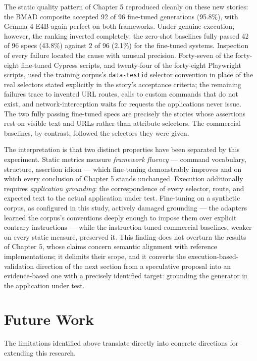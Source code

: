 The static quality pattern of Chapter 5 reproduced cleanly on these new
stories: the BMAD composite accepted 92 of 96 fine-tuned generations
(95.8\%), with Gemma 4 E4B again perfect on both frameworks. Under
genuine execution, however, the ranking inverted completely: the
zero-shot baselines fully passed 42 of 96 specs (43.8\%) against 2 of 96
(2.1\%) for the fine-tuned systems. Inspection of every failure located
the cause with unusual precision. Forty-seven of the forty-eight
fine-tuned Cypress scripts, and twenty-four of the forty-eight
Playwright scripts, used the training corpus's \texttt{data-testid}
selector convention in place of the real selectors stated explicitly in
the story's acceptance criteria; the remaining failures trace to
invented URL routes, calls to custom commands that do not exist, and
network-interception waits for requests the applications never issue.
The two fully passing fine-tuned specs are precisely the stories whose
assertions rest on visible text and URLs rather than attribute
selectors. The commercial baselines, by contrast, followed the selectors
they were given.

The interpretation is that two distinct properties have been separated
by this experiment. Static metrics measure \emph{framework fluency} ---
command vocabulary, structure, assertion idiom --- which fine-tuning
demonstrably improves and on which every conclusion of Chapter 5 stands
unchanged. Execution additionally requires \emph{application grounding}:
the correspondence of every selector, route, and expected text to the
actual application under test. Fine-tuning on a synthetic corpus, as
configured in this study, actively damaged grounding --- the adapters
learned the corpus's conventions deeply enough to impose them over
explicit contrary instructions --- while the instruction-tuned
commercial baselines, weaker on every static measure, preserved it. This
finding does not overturn the results of Chapter 5, whose claims concern
semantic alignment with reference implementations; it delimits their
scope, and it converts the execution-based-validation direction of the
next section from a speculative proposal into an evidence-based one with
a precisely identified target: grounding the generator in the
application under test.

\section{Future Work}

The limitations identified above translate directly into concrete
directions for extending this research.

